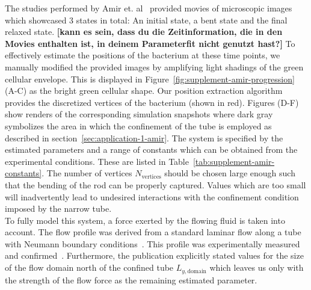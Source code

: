 \documentclass[10pt,letterpaper]{article}
\begin{document}
The studies performed by Amir et. al~\cite{Amir2014,Amir2014_2} provided movies of microscopic
images which showcased 3 states in total:
An initial state, a bent state and the final relaxed state.
{\bf [kann es sein, dass du die Zeitinformation, die in den Movies enthalten ist, in deinem Parameterfit nicht genutzt hast?]}
To effectively estimate the positions of the bacterium at these time points, we manually modified
the provided images by amplifying light shadings of the green cellular envelope.
This is displayed in Figure~\ref{fig:supplement-amir-progression} (A-C) as the bright green cellular
shape.
Our position extraction algorithm provides the discretized vertices of the bacterium (shown in red).
Figures (D-F) show renders of the corresponding simulation snapshots where dark gray symbolizes the
area in which the confinement of the tube is employed as described in
section~\ref{sec:application-1-amir}.
The system is specified by the estimated parameters and a range of constants which can be obtained
from the experimental conditions.
These are listed in Table~\ref{tab:supplement-amir-constants}.
The number of vertices $N_\text{vertices}$ should be chosen large enough such that the bending of
the rod can be properly captured.
Values which are too small will inadvertently lead to undesired interactions with the confinement
condition imposed by the narrow tube.\\
To fully model this system, a force exerted by the flowing fluid is taken into account.
The flow profile was derived from a standard laminar flow along a tube with Neumann boundary
conditions~\cite{Wolschin2021}.
This profile was experimentally measured and confirmed~\cite{Amir2014}.
Furthermore, the publication explicitly stated values for the size of the flow domain north of the
confined tube $L_{y,\text{domain}}$ which leaves us only with the strength of the flow force as the
remaining estimated parameter.
\end{document}
